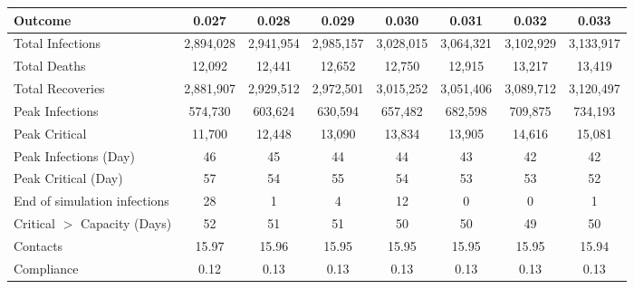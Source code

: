 \begin{table}[ht]
\centering
\begin{tabular}{lccccccc}
  \hline
Outcome & 0.027 & 0.028 & 0.029 & 0.030 & 0.031 & 0.032 & 0.033 \\ 
  \hline
Total Infections & 2,894,028 & 2,941,954 & 2,985,157 & 3,028,015 & 3,064,321 & 3,102,929 & 3,133,917 \\ 
  Total Deaths &    12,092 &    12,441 &    12,652 &    12,750 &    12,915 &    13,217 &    13,419 \\ 
  Total Recoveries & 2,881,907 & 2,929,512 & 2,972,501 & 3,015,252 & 3,051,406 & 3,089,712 & 3,120,497 \\ 
  Peak Infections &   574,730 &   603,624 &   630,594 &   657,482 &   682,598 &   709,875 &   734,193 \\ 
  Peak Critical &    11,700 &    12,448 &    13,090 &    13,834 &    13,905 &    14,616 &    15,081 \\ 
  Peak Infections (Day) &        46 &        45 &        44 &        44 &        43 &        42 &        42 \\ 
  Peak Critical (Day) &        57 &        54 &        55 &        54 &        53 &        53 &        52 \\ 
  End of simulation infections &        28 &         1 &         4 &        12 &         0 &         0 &         1 \\ 
  Critical $>$ Capacity (Days) &        52 &        51 &        51 &        50 &        50 &        49 &        50 \\ 
  Contacts &     15.97 &     15.96 &     15.95 &     15.95 &     15.95 &     15.95 &     15.94 \\ 
  Compliance &      0.12 &      0.13 &      0.13 &      0.13 &      0.13 &      0.13 &      0.13 \\ 
   \hline
\end{tabular}
\end{table}
